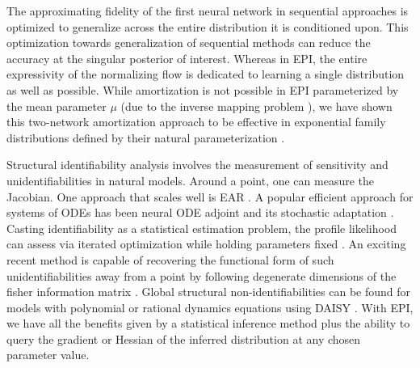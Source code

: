 \documentclass[11pt]{article}
\begin{document}
The approximating fidelity of the first neural network in sequential approaches is optimized to generalize across the entire distribution it is conditioned upon.
This optimization towards generalization of sequential methods can reduce the accuracy at the singular posterior of interest.
Whereas in EPI, the entire expressivity of the normalizing flow is dedicated to learning a single distribution as well as possible.
While amortization is not possible in EPI parameterized by the mean parameter $\mu$ (due to the inverse mapping problem \cite{wainwright2008graphical}), we have shown this two-network amortization approach to be effective in exponential family distributions defined by their natural parameterization \cite{bittner2019approximating}.




Structural identifiability analysis involves the measurement of sensitivity and unidentifiabilities in natural models.
Around a point, one can measure the Jacobian. One approach that scales well is EAR \cite{karlsson2012efficient}.
A popular efficient approach for systems of ODEs has been neural ODE adjoint \cite{chen2018neural} and its stochastic adaptation \cite{li2020scalable}.
Casting identifiability as a statistical estimation problem, the profile likelihood can assess via iterated optimization while holding parameters fixed \cite{raue2009structural}.
An exciting recent method is capable of recovering the functional form of such unidentifiabilities away from a point by following degenerate dimensions of the fisher information matrix \cite{raman2017delineating}.
Global structural non-identifiabilities can be found for models with polynomial or rational dynamics equations using DAISY \cite{saccomani2003parameter}.
With EPI, we have all the benefits given by a statistical inference method plus the ability to query the gradient or Hessian of the inferred distribution at any chosen parameter value.

\end{document}
